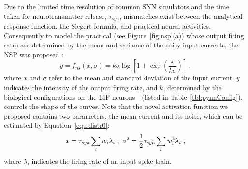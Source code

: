 %	
	Due to the limited time resolution of common SNN simulators and the time taken for neurotransmitter release, $\tau_{syn}$, mismatches exist between the analytical response function, the Siegert formula, and practical neural activities.
	Consequently to model the practical \DIFdelbegin {}\DIFdelend \DIFaddbegin {}\DIFaddend (see Figure~\ref{fig:nsp}(a)) whose output firing rates are determined by \DIFaddbegin {}\DIFaddend the mean and variance of the noisy input currents, the NSP was proposed \DIFaddbegin {}\DIFaddend :
	\begin{equation}
	y = f_{ns}(x, \sigma) = k \sigma \log [1 + \exp(\frac{x}{k \sigma})]~,
	\label{equ:nsp}
	\end{equation}
	where $x$ and $\sigma$ refer to the mean and standard deviation of the input current, $y$ indicates the intensity of the output firing rate, and $k$, determined by the biological configurations on the LIF neurons~\citep{liu2016noisy}~(listed in Table~\ref{tbl:pynnConfig}), controls the shape of the curves.
	Note that the novel activation function we proposed contains two parameters, the mean current and its noise, which can be estimated by Equation~\ref{equ:distr0}:
	\begin{equation}
	x = \tau_{\textit{\textrm{syn}}}\sum_i w_i\lambda_{i}~, ~\sigma^2=\frac{1}{2}\tau_{\textit{\textrm{syn}}}\sum_i w_i^2\lambda_{i}~,
	\label{equ:distr}
	\end{equation}
	where $\lambda_i$ indicates the firing rate of an input spike train.
	\DIFdelbegin %
